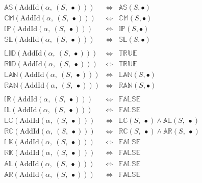\documentclass[10pt]{report}
\newcommand{\propname}[1]{{\mathbb{#1}}}
\begin{document}
\[
\begin{array}{rcl} 
\propname{AS}(\mathrm{AddId}(\alpha,\ (S,\ \bullet))) 
  & \Leftrightarrow
  & \propname{AS}(S, \bullet) \\
\propname{CM}(\mathrm{AddId}(\alpha,\ (S,\ \bullet))) 
  & \Leftrightarrow
  & \propname{CM}(S, \bullet) \\
\propname{IP}(\mathrm{AddId}(\alpha,\ (S,\ \bullet))) 
  & \Leftrightarrow
  & \propname{IP}(S, \bullet) \\
\propname{SL}(\mathrm{AddId}(\alpha,\ (S,\ \bullet))) 
  & \Leftrightarrow
  & \propname{SL}(S, \bullet) \\\\
  
\propname{LID}(\mathrm{AddId}(\alpha,\ (S,\ \bullet))) 
  & \Leftrightarrow
  & \propname{TRUE} \\ 
\propname{RID}(\mathrm{AddId}(\alpha,\ (S,\ \bullet))) 
  & \Leftrightarrow
  & \propname{TRUE} \\ 
\propname{LAN}(\mathrm{AddId}(\alpha,\ (S,\ \bullet))) 
  & \Leftrightarrow
  & \propname{LAN}(S, \bullet) \\
\propname{RAN}(\mathrm{AddId}(\alpha,\ (S,\ \bullet))) 
  & \Leftrightarrow
  & \propname{RAN}(S, \bullet) \\\\
  
\propname{IR}(\mathrm{AddId}(\alpha,\ (S,\ \bullet))) 
  & \Leftrightarrow
  & \propname{FALSE}\\ 
\propname{IL}(\mathrm{AddId}(\alpha,\ (S,\ \bullet))) 
  & \Leftrightarrow
  & \propname{FALSE}\\ 
\propname{LC}(\mathrm{AddId}(\alpha,\ (S,\ \bullet))) 
  & \Leftrightarrow
  & \propname{LC}(S,\ \bullet) \wedge \propname{AL}(S,\ \bullet) \\
\propname{RC}(\mathrm{AddId}(\alpha,\ (S,\ \bullet))) 
  & \Leftrightarrow
  & \propname{RC}(S,\ \bullet) \wedge \propname{AR}(S,\ \bullet) \\
\propname{LK}(\mathrm{AddId}(\alpha,\ (S,\ \bullet))) 
  & \Leftrightarrow
  & \propname{FALSE}\\ 
\propname{RK}(\mathrm{AddId}(\alpha,\ (S,\ \bullet))) 
  & \Leftrightarrow
  & \propname{FALSE}\\ 
\propname{AL}(\mathrm{AddId}(\alpha,\ (S,\ \bullet))) 
  & \Leftrightarrow
  & \propname{FALSE}\\ 
\propname{AR}(\mathrm{AddId}(\alpha,\ (S,\ \bullet))) 
  & \Leftrightarrow
  & \propname{FALSE}\\ 
\end{array} 
\] 
\end{document}
